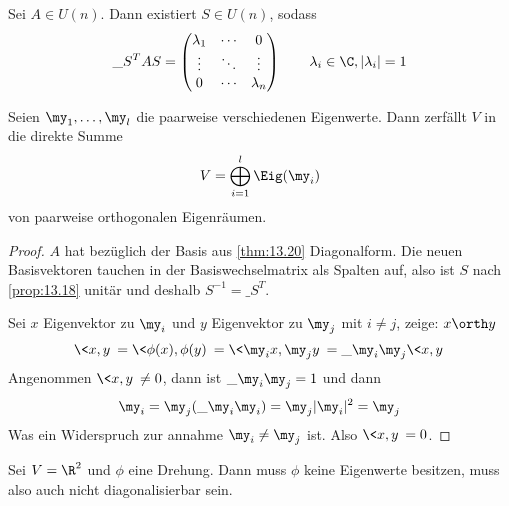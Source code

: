 \documentclass{mycourse}
\begin{document}
\begin{kor}
	\label{kor:13.21}
	Sei $A\in U(n)$.
	Dann existiert $S\in U(n)$, sodass
	\[
	\_S^TAS = \begin{pmatrix}\lambda_1 & \cdots & 0\\\vdots& \ddots & \vdots\\0&\cdots & \lambda_n \end{pmatrix} \qquad \lambda_i \in \C, |\lambda_i| = 1
	\]
	
	Seien $\my_1,\dotsc,\my_l$ die paarweise verschiedenen Eigenwerte.
	Dann zerfällt $V$ in die direkte Summe
	\[
		V = \bigoplus_{i=1}^l \Eig(\my_i)
	\]
	von paarweise orthogonalen Eigenräumen.
	\begin{proof}
		$A$ hat bezüglich der Basis aus \ref{thm:13.20} Diagonalform.
		Die neuen Basisvektoren tauchen in der Basiswechselmatrix als Spalten auf, also ist $S$ nach \ref{prop:13.18} unitär und deshalb $S^{-1}=\_S^T$.

		Sei $x$ Eigenvektor zu $\my_i$ und $y$ Eigenvektor zu $\my_j$ mit $i\neq j$, zeige: $x\orth y$
		\[
			\<x,y\> = \<\phi(x),\phi(y)\> = \<\my_i x,\my_j y\> = \_{\my_i}\my_j\<x,y\>
		\]
		Angenommen $\<x,y\> \neq 0$, dann ist $\_{\my_i}\my_j = 1$  und dann
		\[
			\my_i = \my_j(\_{\my_i}\my_i) = \my_j|\my_i|^2 = \my_j
		\]
		Was ein Widerspruch zur annahme $\my_i\neq \my_j$ ist.
		Also $\<x,y\> = 0$.
	\end{proof}
\end{kor}

\begin{ex}
	Sei $V=\R^2$ und $\phi$ eine Drehung.
	Dann muss $\phi$ keine Eigenwerte besitzen, muss also auch nicht diagonalisierbar sein.
\end{ex}
\end{document}
